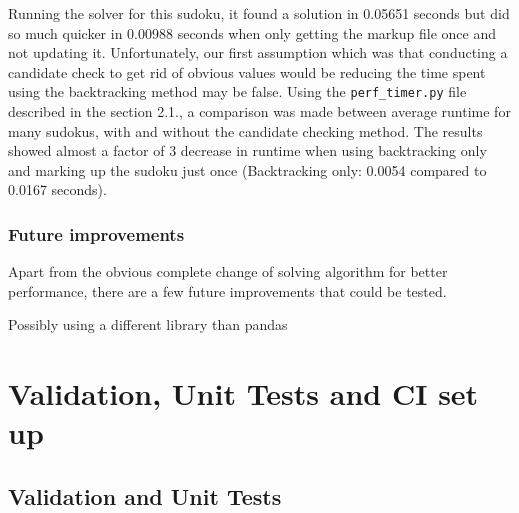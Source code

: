 \documentclass[12pt]{report} %
\begin{document}
Running the solver for this sudoku, it found a solution in 0.05651 seconds but did so much quicker in 0.00988 seconds when only getting the markup file once and not updating it. Unfortunately, our first assumption which was that conducting a candidate check to get rid of obvious values would be reducing the time spent using the backtracking method may be false. Using the \texttt{perf\_timer.py} file described in the section 2.1., a comparison was made between average runtime for many sudokus, with and without the candidate checking method. The results showed almost a factor of 3 decrease in runtime when using backtracking only and marking up the sudoku just once (Backtracking only: 0.0054 compared to 0.0167 seconds).

\subsection{Future improvements}

Apart from the obvious complete change of solving algorithm for better performance, there are a few future improvements that could be tested. 

Possibly using a different library than pandas\cite{no_copy_dataframe}


\chapter{Validation, Unit Tests and CI set up}

\section{Validation and Unit Tests}
\end{document}
